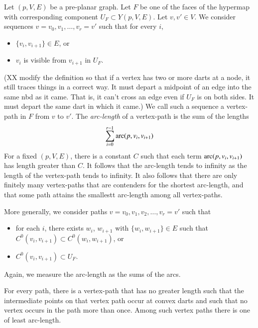 Let $(p,V,E)$ be a pre-planar graph.   
Let $F$ be one of the faces of the
hypermap with corresponding component $U_F\subset Y(p,V,E)$.
Let $v,v'\in V$.    We consider sequences
$v=v_0,v_1,\ldots,v_r=v'$ such that for every $i$,
\begin{itemize}
  \item $\{v_i,v_{i+1}\} \in E$, or
  \item $v_i$ is visible from $v_{i+1}$ in $U_F$.
\end{itemize}
(XX modify the definition so that if a vertex has two or more darts
at a node, it still traces things in a correct way. It must depart
a midpoint of an edge into the same nbd as it came. That is, it
can't cross an edge even if $U_F$ is on both sides.  It must depart
the same dart in which it came.)
We call such a sequence a vertex-path in $F$ from $v$ to $v'$.
The {\it arc-length} of a vertex-path is the sum of the lengths
$$
\sum_{i=0}^{r-1}\operatorname{arc}(p,v_i,v_{i+1})
$$
For a fixed $(p,V,E)$, there is a constant $C$ such that
each term $\operatorname{arc}(p,v_i,v_{i+1})$ has length greater than $C$.  It
follows that the arc-length tends to infinity as the length of
the vertex-path tends to infinity.  It also follows that there are only
finitely many vertex-paths that are contenders for the shortest arc-length,
and that some path attains the smallestt arc-length among all vertex-paths.

More generally, we consider paths
$v=v_0,v_1,v_2,\ldots,v_r=v'$ such that 
\begin{itemize}
\item for each $i$, there exists $w_i$, $w_{i+1}$ with $\{w_i,w_{i+1}\}\in E$
such that $C^0(v_i,v_{i+1})\subset C^0(w_i,w_{i+1})$, or
\item $C^0(v_i,v_{i+1})\subset U_F$.
\end{itemize}
Again, we measure the arc-length as the sums of the arcs.

\begin{lemma}
For every path, there is a vertex-path that has no greater length
such that the intermediate points on that vertex path occur at convex darts
and such that no vertex occurs in the path more than once.
Among such vertex paths there is one of least arc-length.
\end{lemma}

